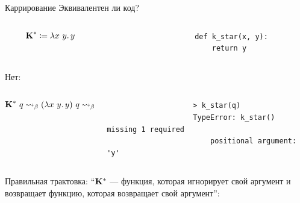 
    \appendix

    \begin{frame}[fragile]{Каррирование}
        \vspace{-0.5em}
        Эквивалентен ли код?
        \vspace{-1em}
        \begin{columns}[onlytextwidth]
            \begin{column}[t]{0.485\textwidth}
                \vspace{0.2 em}
                \[\textbf{K}^* \coloneqq \lambda x~y\ldotp y\]
            \end{column}\hfill%
            \begin{column}[t]{0.485\textwidth}
                \begin{verbatim}
                    def k_star(x, y):
                        return y
                \end{verbatim}
            \end{column}
        \end{columns}
        \pause
        Нет:
        \vspace{-2em}
        \begin{columns}[onlytextwidth]
            \begin{column}[t]{0.485\textwidth}
                \vspace{0.5em}
                \[\mathbf{K}^* ~ q \rightsquigarrow_\beta (\lambda x~y\ldotp y) ~ q \rightsquigarrow_\beta \lambda y\ldotp y \]
            \end{column}\hfill%
            \begin{column}[t]{0.485\textwidth}
                \begin{verbatim}
                    > k_star(q)
                    TypeError: k_star() missing 1 required
                        positional argument: 'y'
                \end{verbatim}
            \end{column}
        \end{columns}
        \pause
        \vspace{0.3em}
        Правильная трактовка: ``$\mathbf{K}^*$ --- функция, которая игнорирует свой аргумент и возвращает
        функцию, которая возвращает свой аргумент'':
        \vspace{-1.5em}
        \begin{columns}[onlytextwidth]
            \begin{column}[t]{0.485\textwidth}

\end{column}
\end{columns}
\end{frame}

